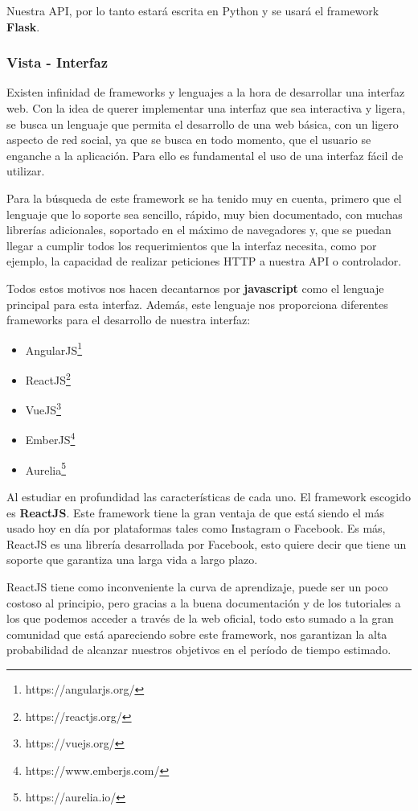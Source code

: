 Nuestra API, por lo tanto estará escrita en Python y se usará el framework \textbf{Flask}.

\subsubsection{Vista - Interfaz}

Existen infinidad de frameworks y lenguajes a la hora de desarrollar una interfaz web. Con la idea de querer implementar una interfaz que sea interactiva y ligera, se busca un lenguaje que permita el desarrollo de una web básica, con un ligero aspecto de red social, ya que se busca en todo momento, que el usuario se enganche a la aplicación. Para ello es fundamental el uso de una interfaz fácil de utilizar.

Para la búsqueda de este framework se ha tenido muy en cuenta, primero que el lenguaje que lo soporte sea sencillo, rápido, muy bien documentado, con muchas librerías adicionales, soportado en el máximo de navegadores y, que se puedan llegar a cumplir todos los requerimientos que la interfaz necesita, como por ejemplo, la capacidad de realizar peticiones HTTP a nuestra API o controlador.

Todos estos motivos nos hacen decantarnos por \textbf{javascript} como el lenguaje principal para esta interfaz. Además, este lenguaje nos proporciona diferentes frameworks para el desarrollo de nuestra interfaz\cite{framework}:

\begin{itemize}
    \item AngularJS\footnote{https://angularjs.org/}
    \item ReactJS\footnote{https://reactjs.org/}
    \item VueJS\footnote{https://vuejs.org/}
    \item EmberJS\footnote{https://www.emberjs.com/}
    \item Aurelia\footnote{https://aurelia.io/}
\end{itemize}

Al estudiar en profundidad las características de cada uno\cite{framework2}. El framework escogido es \textbf{ReactJS}. Este framework tiene la gran ventaja de que está siendo el más usado hoy en día por plataformas tales como Instagram o Facebook. Es más, ReactJS es una librería desarrollada por Facebook, esto quiere decir que tiene un soporte que garantiza una larga vida a largo plazo.

ReactJS tiene como inconveniente la curva de aprendizaje, puede ser un poco costoso al principio, pero gracias a la buena documentación y de los tutoriales a los que podemos acceder a través de la web oficial, todo esto sumado a la gran comunidad que está apareciendo sobre este framework, nos garantizan la alta probabilidad de alcanzar nuestros objetivos en el período de tiempo estimado.

